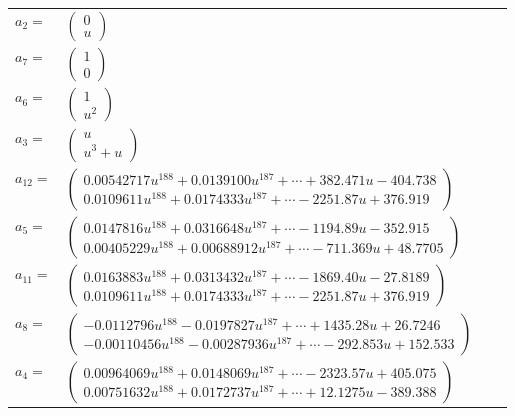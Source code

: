 \documentclass[1p]{elsarticle_modified}
\theoremstyle{definition}
\begin{document}
\begin{tabular}{m{7pt} m{180pt} m{7pt} m{180pt} }
\flushright $a_{2}=$&$\begin{pmatrix}0\\u\end{pmatrix}$ \\
\flushright $a_{7}=$&$\begin{pmatrix}1\\0\end{pmatrix}$ \\
\flushright $a_{6}=$&$\begin{pmatrix}1\\u^2\end{pmatrix}$ \\
\flushright $a_{3}=$&$\begin{pmatrix}u\\u^3+u\end{pmatrix}$ \\
\flushright $a_{12}=$&$\begin{pmatrix}0.00542717 u^{188}+0.0139100 u^{187}+\cdots+382.471 u-404.738\\0.0109611 u^{188}+0.0174333 u^{187}+\cdots-2251.87 u+376.919\end{pmatrix}$ \\
\flushright $a_{5}=$&$\begin{pmatrix}0.0147816 u^{188}+0.0316648 u^{187}+\cdots-1194.89 u-352.915\\0.00405229 u^{188}+0.00688912 u^{187}+\cdots-711.369 u+48.7705\end{pmatrix}$ \\
\flushright $a_{11}=$&$\begin{pmatrix}0.0163883 u^{188}+0.0313432 u^{187}+\cdots-1869.40 u-27.8189\\0.0109611 u^{188}+0.0174333 u^{187}+\cdots-2251.87 u+376.919\end{pmatrix}$ \\
\flushright $a_{8}=$&$\begin{pmatrix}-0.0112796 u^{188}-0.0197827 u^{187}+\cdots+1435.28 u+26.7246\\-0.00110456 u^{188}-0.00287936 u^{187}+\cdots-292.853 u+152.533\end{pmatrix}$ \\
\flushright $a_{4}=$&$\begin{pmatrix}0.00964069 u^{188}+0.0148069 u^{187}+\cdots-2323.57 u+405.075\\0.00751632 u^{188}+0.0172737 u^{187}+\cdots+12.1275 u-389.388\end{pmatrix}$ \\

\end{tabular}
\end{document}
